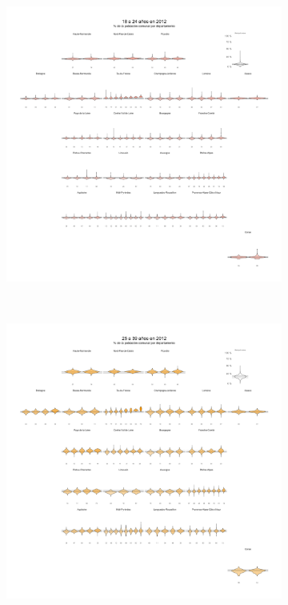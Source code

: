 \begin{figure}[h]
\begin{subfigure}{0.3\textwidth}
	\includegraphics[width = \textwidth]{Figs/AED/Geofacet_Distr_por_Dpto_Ed2_2012}
	\end{subfigure}
	~
	\begin{subfigure}{0.3\textwidth}
	\includegraphics[width = \textwidth]{Figs/AED/Geofacet_Distr_por_Dpto_Ed3_2012}

\end{subfigure}
\end{figure}
